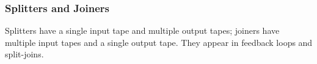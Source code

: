 \documentclass[11pt]{article}
\newcommand{\new}{\marginpar{\footnotesize \textbf{~~--~New~--}}}
\begin{document}
\subsubsection{Splitters and Joiners}

Splitters have a single input tape and multiple output tapes; joiners
have multiple input tapes and a single output tape.  They appear in
feedback loops and split-joins.






\end{document}
